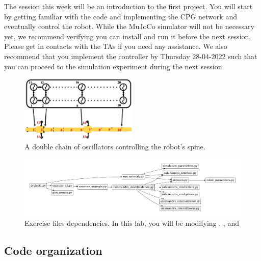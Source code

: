 \documentclass{cmc}
\begin{document}
 The session this week will be an introduction to the first
project. You will start by getting familiar with the code and implementing the
CPG network and eventually control the robot. While the MuJoCo simulator will
not be necessary yet, we recommend verifying you can install and run it before
the next session. Please get in contacts with the TAs if you need any
assistance. We also recommend that you implement the controller by Thursday
28-04-2022 such that you can proceed to the simulation experiment during the
next session.

\begin{figure}[h]
  \centering
  \includegraphics[width=0.5\textwidth]{figures/model_controller.png}
  \caption[Controller model]{A double chain of oscillators controlling
    the robot’s spine.}
  \label{fig:controller-model}
\end{figure}

\begin{figure}[ht]
  \centering \includegraphics[width=1.0\textwidth]{figures/files}
  \caption{\label{fig:files} Exercise files dependencies. In this lab, you will
    be modifying , ,
     and }
\end{figure}


\subsection*{Code organization}
\label{subsec:code}
\end{document}
